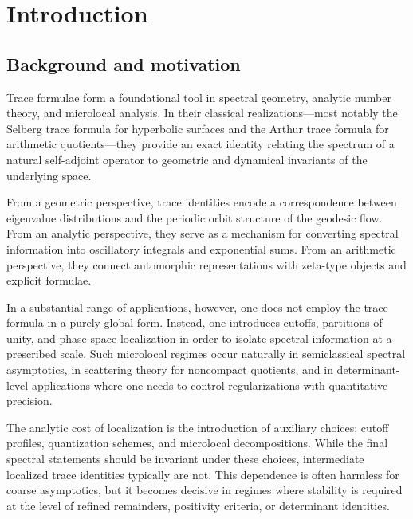 
\chapter{Introduction}
\label{chap:01-introduction}

\section{Background and motivation}
\label{sec:01.background}

Trace formulae form a foundational tool in spectral geometry, analytic number theory, and microlocal analysis.
In their classical realizations---most notably the Selberg trace formula for hyperbolic surfaces and the Arthur trace
formula for arithmetic quotients---they provide an exact identity relating the spectrum of a natural self-adjoint
operator to geometric and dynamical invariants of the underlying space.

From a geometric perspective, trace identities encode a correspondence between eigenvalue distributions and the
periodic orbit structure of the geodesic flow.  From an analytic perspective, they serve as a mechanism for
converting spectral information into oscillatory integrals and exponential sums.  From an arithmetic perspective,
they connect automorphic representations with zeta-type objects and explicit formulae.

In a substantial range of applications, however, one does not employ the trace formula in a purely global form.
Instead, one introduces cutoffs, partitions of unity, and phase-space localization in order to isolate spectral
information at a prescribed scale.  Such microlocal regimes occur naturally in semiclassical spectral asymptotics,
in scattering theory for noncompact quotients, and in determinant-level applications where one needs to control
regularizations with quantitative precision.

The analytic cost of localization is the introduction of auxiliary choices: cutoff profiles, quantization schemes,
and microlocal decompositions.  While the final spectral statements should be invariant under these choices,
intermediate localized trace identities typically are not.  This dependence is often harmless for coarse asymptotics,
but it becomes decisive in regimes where stability is required at the level of refined remainders, positivity
criteria, or determinant identities.

